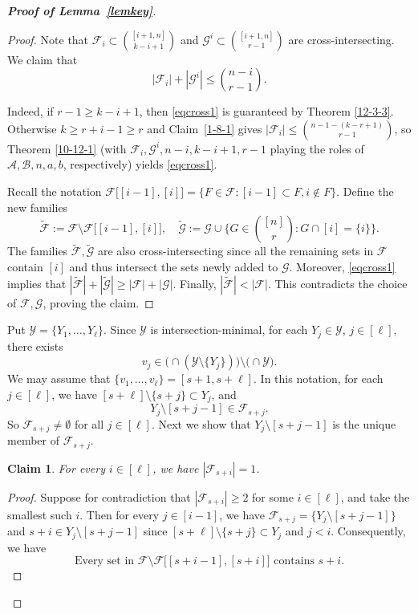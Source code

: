 \documentclass[11pt]{article}
\def\marrow{{\boldmath {\marginpar[\hfill$\rightarrow \rightarrow$]{$\leftarrow \leftarrow$}}}}
\def\andrey#1{{\sc Andrey: }{\marrow\sf \textcolor{blue}{#1}}}
\newcommand{\m}{\mathcal}
\def\yang#1{{\sc Yang: }{\marrow\sf \textcolor{cyan}{#1}}}
\newtheorem{claim}[theorem]{Claim}
\begin{document}
\begin{proof}[{\bf Proof of Lemma~\ref{lemkey}}]
\begin{proof}
Note that $\mathcal{F}_i\subset {[i+1,n]\choose k-i+1}$ and $\mathcal{G}^i\subset {[i+1,n]\choose r-1}$ are cross-intersecting. We claim that 
\begin{equation}
    \label{eqcross1} |\m F_i|+|\mathcal{G}^i|\le {n-i\choose r-1}.
\end{equation}

Indeed, if $r-1\ge k-i+1$, then \eqref{eqcross1} is guaranteed by Theorem \ref{12-3-3}. Otherwise $k\ge r+i-1\ge r$ and Claim~\ref{1-8-1} gives $|\m F_i|\le {n-1-(k-r+1)\choose r-1}$, so Theorem \ref{10-12-1} (with $\m F_i, \m G^i, n-i, k-i+1, r-1$ playing the roles of $\m A, \m B,n,a,b$, respectively) yields \eqref{eqcross1}.

Recall the notation $\m F\big[[i-1], [i]\big]=\{F\in \m F: [i-1]\subset F, i\not\in F\}$.
Define the new families 
\[
\tilde{\m F}:=\m F\setminus \m F\big[[i-1], [i]\big], \quad 
\tilde{\m G}:=\m G\cup \big\{G\in {[n]\choose r}: G\cap [i]=\{i\}\big\}.
\]
The families $\tilde{\m F}, \tilde{\m G}$ are also cross-intersecting since all the remaining sets in $\m F$ contain $[i]$ and thus intersect the sets newly added to $\m G$. Moreover, \eqref{eqcross1} implies that $|\tilde{\m F}|+|\tilde{\m G}|\ge |\m F|+|\m G|$. Finally, $|\tilde{\m F}|<|\m F|$. This contradicts the choice of $\m F, \m G$, proving the claim.
\end{proof}

Put $\mathcal{Y}=\{Y_1, \dots, Y_{\ell}\}$. Since $\mathcal{Y}$ is intersection-minimal, for each $Y_j\in \mathcal{Y}$, $j\in [\ell]$, there exists
\[
v_j\in \Big(\cap (\mathcal{Y}\setminus \{Y_j\})\Big)\setminus \Big(\cap\mathcal{Y}\Big).
\]
We may assume that $\{v_1, \dots, v_\ell\}=[s+1, s+\ell]$. In this notation, for each $j\in [\ell]$, we have $[s+\ell]\setminus \{s+j\}\subset Y_j$, and  $$Y_j\setminus [s+j-1] \in \m F_{s+j}.$$
So $\m F_{s+j}\ne \emptyset$ for all $j\in [\ell]$. 
Next we show that $Y_j\setminus [s+j-1]$ is the unique member of $\m F_{s+j}$. 

\begin{claim}\label{12-14-1}
For every $i\in [\ell]$, we have $|\m F_{s+i}|=1$.  
\end{claim}

\begin{proof}
Suppose for contradiction that $|\mathcal{F}_{s+i}|\ge 2$ for some $i\in [\ell]$, and take the smallest such $i$. Then for every $j\in [i-1]$, we have $\m F_{s+j}=\{Y_j\setminus [s+j-1]\}$ and $s+i\in Y_j\setminus [s+j-1]$ since $[s+\ell]\setminus \{s+j\}\subset Y_j$ and $j<i$. Consequently, we have
\begin{equation}\label{contains+i}
    \text{Every set in $\m F\setminus \m F\big[[s+i-1],[s+i]\big]$ contains $s+i$.}
\end{equation}


\end{proof}
\end{proof}
\end{document}
